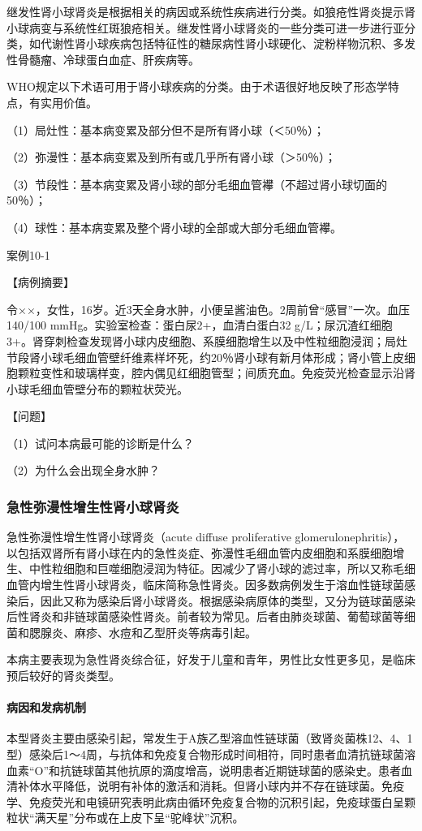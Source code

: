 继发性肾小球肾炎是根据相关的病因或系统性疾病进行分类。如狼疮性肾炎提示肾小球病变与系统性红斑狼疮相关。继发性肾小球肾炎的一些分类可进一步进行亚分类，如代谢性肾小球疾病包括特征性的糖尿病性肾小球硬化、淀粉样物沉积、多发性骨髓瘤、冷球蛋白血症、肝疾病等。

WHO规定以下术语可用于肾小球疾病的分类。由于术语很好地反映了形态学特点，有实用价值。

（1）局灶性：基本病变累及部分但不是所有肾小球（＜50％）；

（2）弥漫性：基本病变累及到所有或几乎所有肾小球（＞50％）；

（3）节段性：基本病变累及肾小球的部分毛细血管襻（不超过肾小球切面的50％）；

（4）球性：基本病变累及整个肾小球的全部或大部分毛细血管襻。

\begin{framed}
{案例10-1}

{【病例摘要】}

令××，女性，16岁。近3天全身水肿，小便呈酱油色。2周前曾“感冒”一次。血压140/100
mmHg。实验室检查：蛋白尿2+，血清白蛋白32
g/L；尿沉渣红细胞3+。肾穿刺检查发现肾小球内皮细胞、系膜细胞增生以及中性粒细胞浸润；局灶节段肾小球毛细血管壁纤维素样坏死，约20％肾小球有新月体形成；肾小管上皮细胞颗粒变性和玻璃样变，腔内偶见红细胞管型；间质充血。免疫荧光检查显示沿肾小球毛细血管壁分布的颗粒状荧光。

{【问题】}

（1）试问本病最可能的诊断是什么？

（2）为什么会出现全身水肿？
\end{framed}

\subsubsection{急性弥漫性增生性肾小球肾炎}

急性弥漫性增生性肾小球肾炎（acute diffuse proliferative
glomerulonephritis），以包括双肾所有肾小球在内的急性炎症、弥漫性毛细血管内皮细胞和系膜细胞增生、中性粒细胞和巨噬细胞浸润为特征。因减少了肾小球的滤过率，所以又称毛细血管内增生性肾小球肾炎，临床简称急性肾炎。因多数病例发生于溶血性链球菌感染后，因此又称为感染后肾小球肾炎。根据感染病原体的类型，又分为链球菌感染后性肾炎和非链球菌感染性肾炎。前者较为常见。后者由肺炎球菌、葡萄球菌等细菌和腮腺炎、麻疹、水痘和乙型肝炎等病毒引起。

本病主要表现为急性肾炎综合征，好发于儿童和青年，男性比女性更多见，是临床预后较好的肾炎类型。

\paragraph{病因和发病机制}
本型肾炎主要由感染引起，常发生于A族乙型溶血性链球菌（致肾炎菌株12、4、1型）感染后1～4周，与抗体和免疫复合物形成时间相符，同时患者血清抗链球菌溶血素“O”和抗链球菌其他抗原的滴度增高，说明患者近期链球菌的感染史。患者血清补体水平降低，说明有补体的激活和消耗。但肾小球内并不存在链球菌。免疫学、免疫荧光和电镜研究表明此病由循环免疫复合物的沉积引起，免疫球蛋白呈颗粒状“满天星”分布或在上皮下呈“驼峰状”沉积。

